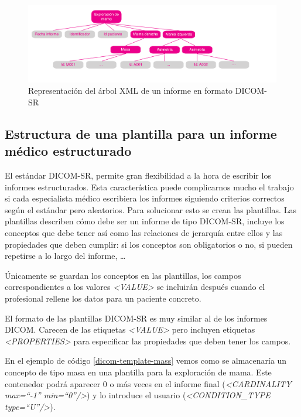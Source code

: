 \begin{figure}[ht]
\centering
\includegraphics[scale=0.7]{./imgs/esquemas/dicomsrTreeReportA.pdf}
\caption{Representación del árbol XML de un informe en formato DICOM-SR}
\label{fig:dicom-report}
\end{figure}

\subsection{Estructura de una plantilla para un informe médico estructurado}\label{dicomsr:plantillas}
El estándar DICOM-SR, permite gran flexibilidad a la hora de escribir los informes estructurados. Esta característica puede complicarnos mucho el trabajo si cada especialista médico escribiera los informes siguiendo criterios correctos según el estándar pero aleatorios.
Para solucionar esto se crean las plantillas.
Las plantillas describen cómo debe ser un informe de tipo DICOM-SR, incluye los conceptos que debe tener así como las relaciones de jerarquía entre ellos y las propiedades que deben cumplir: si los conceptos son obligatorios o no, si pueden repetirse a lo largo del informe, \ldots\par 
Únicamente se guardan los conceptos en las plantillas, los campos correspondientes a los valores  \textit{<VALUE>} se incluirán después cuando el profesional rellene los datos para un paciente concreto.\par
El formato de las plantillas DICOM-SR es muy similar al de los informes DICOM. Carecen de las etiquetas \textit{<VALUE>} pero incluyen etiquetas \emph{<PROPERTIES>} para especificar las propiedades que deben tener los campos.\par
En el ejemplo de código \ref{dicom-template-mass} vemos como se almacenaría un concepto de tipo masa en una plantilla para la exploración de mama. Este contenedor podrá aparecer 0 o más veces en el informe final  (\textit{<CARDINALITY max=``-1'' min=``0''/>}) y lo introduce el usuario (\textit{<CONDITION\_TYPE type=``U''/>}).\medskip\par


